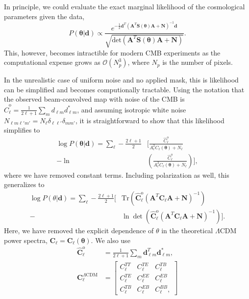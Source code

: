 \documentclass[twocolumn]{../common/aa}
\begin{document}
In principle, we could evaluate the exact marginal likelihood of the cosmological parameters given the data, 
\begin{equation}
    P(\boldsymbol{\theta} | \boldsymbol{d}) \propto \frac{e^{-\frac12 \boldsymbol{d}^T (\boldsymbol{A}^T \boldsymbol{S}(\boldsymbol{\theta}) \boldsymbol{A} + \boldsymbol{N})^{-1}\boldsymbol{d}}}{\sqrt{\text{det}\left(\boldsymbol{A}^T \boldsymbol{S}(\boldsymbol{\theta}) \boldsymbol{A} + \boldsymbol{N}\right)}}.
\end{equation}
This, however, becomes intractible for modern CMB experiments as the computational expense grows as $\mathcal{O}(N_p^3)$, where $N_p$ is the number of pixels.

In the unrealistic case of uniform noise and no applied mask, this is likelihood can be simplified and becomes computionally tractable. Using the notation that the observed beam-convolved map with noise of the CMB is $\hat{C}^{\mathrm{o}}_{\ell} = \frac{1}{2\ell+1}\sum_m d_{\ell m}d^*_{\ell m}$, and assuming isotropic white noise $N_{\ell m \ell'm'} = N_\ell \delta_{\ell \ell'}\delta_{mm'}$, it is straightforward to show that this likelihood simplifies to
\begin{align}
    \nonumber
    \log P(\boldsymbol{\theta} | \boldsymbol{d}) = \sum_{\ell} -\frac{2\ell+1}{2} &\bigg[\frac{\hat{C}^{\mathrm{o}}_{\ell}}{A_\ell^2 C_{\ell}(\boldsymbol{\theta}) + N_\ell}\\
    -\ln &\left(\frac{\hat{C}^{\mathrm{o}}_{\ell}}{A_\ell^2 C_{\ell}(\boldsymbol{\theta}) + N_\ell} \right) \bigg],
\end{align}
where we have removed constant terms. Including polarization as well, this generalizes to \citep{Hamimeche:2008ai}
\begin{align}
    \nonumber
    \log P(\theta | \boldsymbol{d}) = \sum_\ell -\frac{2\ell+1}{2} \bigg[&\mathrm{Tr}\left(\hat{\boldsymbol C}^{\mathrm{o}}_{\ell}  \left(\boldsymbol{A}^T \boldsymbol{C}_{\ell} \boldsymbol{A} + \boldsymbol{N}\right)^{-1}\right)\\
    - &\ln \det \left(\hat{\boldsymbol C}^\mathrm{o}_{\ell}  \left(\boldsymbol{A}^T \boldsymbol{C}_{\ell} \boldsymbol{A} + \boldsymbol{N}\right)^{-1}\right)\bigg].
\end{align}
Here, we have removed the explicit dependence of $\theta$ in the theoretical $\Lambda$CDM power spectra, $\boldsymbol{C}_{\ell} = \boldsymbol{C}_{\ell}(\boldsymbol{\theta})$. We also use
\begin{align}
    \hat{\boldsymbol C}^{\mathrm{o}}_{\ell} &= \frac{1}{2\ell+1}\sum_m \boldsymbol{d}_{\ell m}^T \boldsymbol{d}^*_{\ell m},\\
    \boldsymbol{C}^{\Lambda\mathrm{CDM}}_{\ell} &= \begin{bmatrix}
        C^{TT}_\ell & C^{TE}_\ell & C^{TB}_\ell\\
        C^{TE}_\ell & C^{EE}_\ell & C^{EB}_\ell\\
        C^{TB}_\ell & C^{EB}_\ell & C^{BB}_\ell,
    \end{bmatrix}
\end{align}
\end{document}
